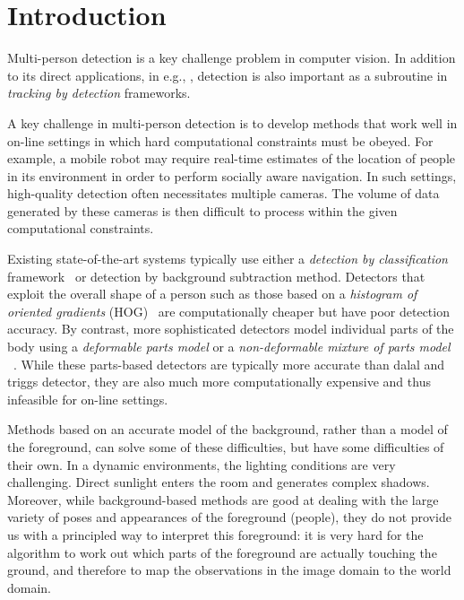 \documentclass[10pt,twocolumn,letterpaper]{article}
\begin{document}
\section{Introduction}
Multi-person detection is a key challenge problem in computer vision.  In addition to its direct applications, in e.g., , detection is also important as a subroutine in \emph{tracking by detection}  frameworks.  

A key challenge in multi-person detection is to develop methods that work well in on-line settings in which hard computational constraints must be obeyed. For example, a mobile robot may require real-time  estimates of the location of people in its environment in order to perform socially aware navigation.  In such settings, high-quality detection often necessitates multiple cameras.  The volume of data generated by these cameras is then difficult to process within the given computational constraints.  

Existing state-of-the-art systems typically use either a \emph{detection by classification} framework~\cite{Pami-11} or detection by background subtraction method.
 Detectors that exploit the overall shape of a person such as those based on a \emph{histogram of oriented gradients} (HOG)~\cite{dalaltriggs} are computationally cheaper  but have poor detection accuracy.  By contrast, more sophisticated detectors model individual parts of the body using a \emph{deformable parts model} \cite{DPM} or a \emph{non-deformable mixture of parts model} ~\cite{partsDeva}. While these parts-based detectors are typically more accurate than dalal and triggs detector, they are also much more computationally expensive and thus infeasible for on-line settings.

Methods based on an accurate model of the background, rather than a model of the foreground, can solve some of these difficulties, but have some difficulties of their own. In a dynamic environments, the lighting conditions are very challenging.  Direct sunlight enters the room and generates complex shadows. Moreover, while background-based methods are good at dealing with the large variety of poses and appearances of the foreground (people), they do not provide us with a principled way to interpret this foreground: it is very hard for the algorithm to work out which parts of the foreground are actually touching the ground, and therefore to map the observations in the image domain to the world domain.
\end{document}
